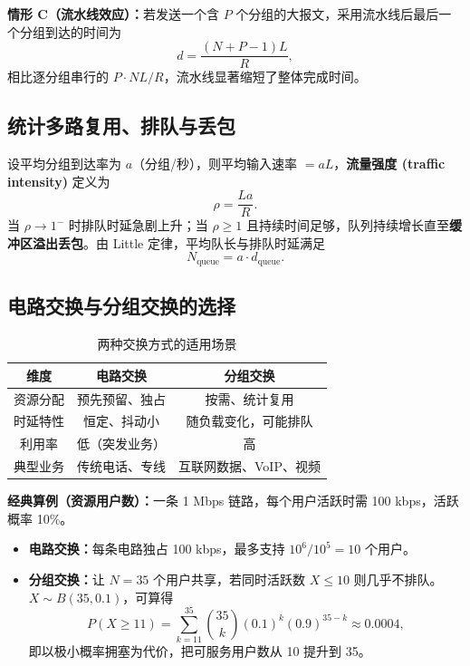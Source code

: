 \textbf{情形 C（流水线效应）：}若发送一个含 $P$ 个分组的大报文，采用流水线后最后一个分组到达的时间为
\[
d = \frac{(N+P-1)L}{R},
\]
相比逐分组串行的 $P\cdot N L/R$，流水线显著缩短了整体完成时间。

\subsection{统计多路复用、排队与丢包}
设平均分组到达率为 $a$（分组/秒），则平均输入速率 $= aL$，\textbf{流量强度 (traffic intensity)} 定义为
\begin{equation}
    \rho = \frac{L a}{R}.
\end{equation}
当 $\rho \to 1^{-}$ 时排队时延急剧上升；当 $\rho \ge 1$ 且持续时间足够，队列持续增长直至\textbf{缓冲区溢出丢包}。由 Little 定律，平均队长与排队时延满足
\begin{equation}
    N_{\text{queue}} = a \cdot d_{\text{queue}}.
\end{equation}

\subsection{电路交换与分组交换的选择}
\begin{table}[H]
\centering
\caption{两种交换方式的适用场景}
\begin{tabulary}{\textwidth}{CCC}
\toprule
维度 & 电路交换 & 分组交换 \\
\midrule
资源分配 & 预先预留、独占 & 按需、统计复用 \\
时延特性 & 恒定、抖动小 & 随负载变化，可能排队 \\
利用率 & 低（突发业务） & 高 \\
典型业务 & 传统电话、专线 & 互联网数据、VoIP、视频 \\
\bottomrule
\end{tabulary}
\end{table}

\textbf{经典算例（资源用户数）：}一条 1 Mbps 链路，每个用户活跃时需 100 kbps，活跃概率 10\%。
\begin{itemize}
    \item \textbf{电路交换：}每条电路独占 100 kbps，最多支持 $10^6/10^5 = 10$ 个用户。
    \item \textbf{分组交换：}让 $N=35$ 个用户共享，若同时活跃数 $X \le 10$ 则几乎不排队。$X\sim B(35,0.1)$，可算得
    \[
    P(X \ge 11) = \sum_{k=11}^{35}\binom{35}{k}(0.1)^k(0.9)^{35-k} \approx 0.0004,
    \]
    即以极小概率拥塞为代价，把可服务用户数从 10 提升到 35。
\end{itemize}

